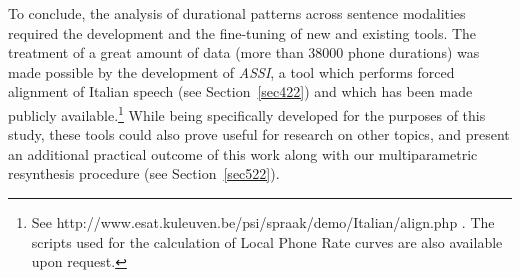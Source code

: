To conclude, the analysis of durational patterns across sentence modalities required the development and the fine-tuning of new and existing tools. The treatment of a great amount of data (more than 38000 phone durations) was made possible by the development of \textit{ASSI}, a tool which performs forced alignment of Italian speech (see Section~\ref{sec422}) and which has been made publicly available.\footnote{See http://www.esat.kuleuven.be/psi/spraak/demo/Italian/align.php . The scripts used for the calculation of Local Phone Rate curves are also available upon request.} While being specifically developed for the purposes of this study, these tools could also prove useful for research on other topics, and present an additional practical outcome of this work along with our multiparametric resynthesis procedure (see Section~\ref{sec522}).